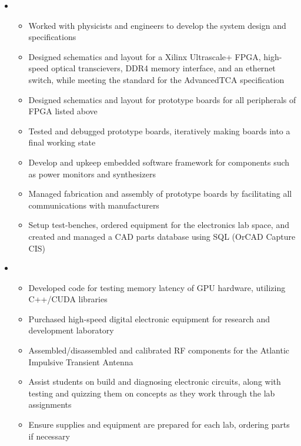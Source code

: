 \documentclass[10pt,a4paper,sans]{moderncv}        %
\begin{document}
\begin{itemize}

\item{
\begin{itemize}
\item Worked with physicists and engineers to develop the system design and specifications
\item Designed schematics and layout for a Xilinx Ultrascale+ FPGA, high-speed optical transcievers, DDR4 memory interface, and an ethernet switch, while meeting the standard for the AdvancedTCA specification
\item Designed schematics and layout for prototype boards for all peripherals of FPGA listed above
\item Tested and debugged prototype boards, iteratively making boards into a final working state
\item Develop and upkeep embedded software framework for components such as power monitors and synthesizers
\item Managed fabrication and assembly of prototype boards by facilitating all communications with manufacturers
\item Setup test-benches, ordered equipment for the electronics lab space, and created and managed a CAD parts database using SQL (OrCAD Capture CIS)
\end{itemize}
}

\vspace{6pt}

\item{
\begin{itemize}
\item Developed code for testing memory latency of GPU hardware, utilizing C++/CUDA libraries
\item Purchased high-speed digital electronic equipment for research and development laboratory
\item Assembled/disassembled and calibrated RF components for the Atlantic Impulsive Transient Antenna
\item Assist students on build and diagnosing electronic circuits, along with testing and quizzing them on concepts as they work through the lab assignments
\item Ensure supplies and equipment are prepared for each lab, ordering parts if necessary
\end{itemize}
}

\vspace{6pt}


\end{itemize}
\end{document}
